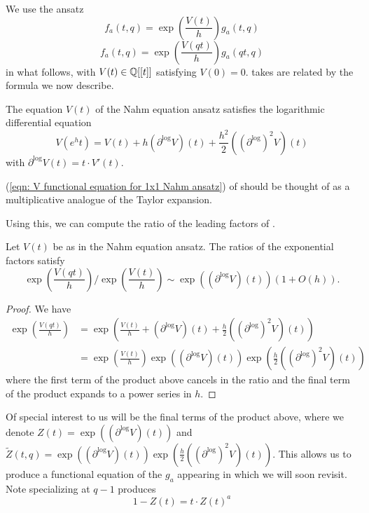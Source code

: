 We use the ansatz 
\begin{equation}\label{eqn: 1x1 Nahm sum ansatz}
    f_{a}(t,q)=\exp\left(\frac{V(t)}{h}\right)g_{a}(t,q)
\end{equation}
\begin{equation}\label{eqn: qt 1x1 Nahm sum ansatz}
    f_{a}(t,q)=\exp\left(\frac{V(qt)}{h}\right)g_{a}(qt,q)
\end{equation}
in what follows, with $V(t)\in\mathbb{Q}[[t]]$ satisfying $V(0)=0$.  takes are related by the formula we now describe. 
\begin{proposition}\label{prop: V functional equation for 1x1 Nahm ansatz}
    The equation $V(t)$ of the Nahm equation ansatz satisfies the logarithmic differential equation 
    \begin{equation}\label{eqn: V functional equation for 1x1 Nahm ansatz}
        V(e^{h}t) = V(t) + h(\partial^{\log}V)(t)+\frac{h^{2}}{2}((\partial^{\log})^{2}V)(t)
    \end{equation}
    with $\partial^{\log}V(t)=t\cdot V'(t)$.
\end{proposition}
\begin{remark}
    (\ref{eqn: V functional equation for 1x1 Nahm ansatz}) of  should be thought of as a multiplicative analogue of the Taylor expansion. 
\end{remark}
Using this, we can compute the ratio of the leading factors of . 
\begin{corollary}\label{corr: exponent ratio for 1x1 Nahm sum antsatz}
    Let $V(t)$ be as in the Nahm equation ansatz. The ratios of the exponential factors satisfy 
    $$\exp\left(\frac{V(qt)}{h}\right)/\exp\left(\frac{V(t)}{h}\right)\sim\exp((\partial^{\log}V)(t))(1+O(h)).$$ 
\end{corollary}
\begin{proof}
    We have 
    \begin{align*}
        \exp\left(\frac{V(qt)}{h}\right) &= \exp\left(\frac{V(t)}{h}+(\partial^{\log}V)(t)+\frac{h}{2}((\partial^{\log})^{2}V)(t)\right)\\
        &=\exp\left(\frac{V(t)}{h}\right)\exp\left((\partial^{\log}V)(t)\right)\exp\left(\frac{h}{2}((\partial^{\log})^{2}V)(t)\right)
    \end{align*}
    where the first term of the product above cancels in the ratio and the final term of the product expands to a power series in $h$. 
\end{proof}
Of special interest to us will be the final terms of the product above, where we denote $Z(t)=\exp((\partial^{\log}V)(t))$ and $\widetilde{Z}(t,q)=\exp\left((\partial^{\log}V)(t)\right)\exp\left(\frac{h}{2}((\partial^{\log})^{2}V)(t)\right)$.
This allows us to produce a functional equation of the $g_{a}$ appearing in  which we will soon revisit. Note specializing at $q-1$ produces 
\begin{equation}\label{eqn: specialized Z functional equation}
    1-Z(t)=t\cdot Z(t)^{a}
\end{equation}

